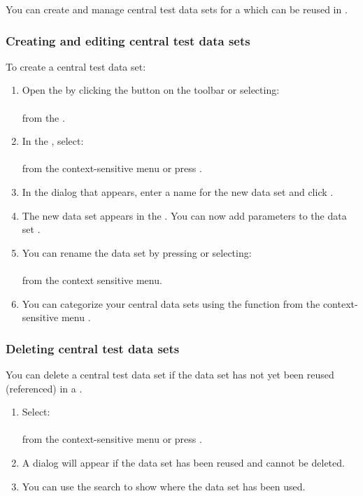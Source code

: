 You can create and manage central test data sets for a \gdproject{} which can be reused in \gdcases{}. 

\subsubsection{Creating and editing central test data sets}
\label{TasksCentralDataCreate}

To create a central test data set:
\begin{enumerate}
\item Open the  \gddataeditor{} by clicking the  button on the toolbar or selecting:\\
\\
from the \gdtestsuitebrowser{}.
\item In the \gddataeditor{}, select:\\
\\
from the context-sensitive menu or press .
\item In the dialog that appears, enter a name for the new data set and click .
\item The new data set appears in the \gddataeditor{}. You can now add parameters to the data set .
\item You can rename the data set by pressing or selecting:\\
\\
from the context sensitive menu.
\item You can categorize your central data sets using the  function from the context-sensitive menu .
\end{enumerate}

\subsubsection{Deleting central test data sets}
You can delete a central test data set if the data set has not yet been reused (referenced) in a \gdcase{} . 
\begin{enumerate}
\item Select:\\
\\
from the context-sensitive menu or press .

\item A dialog will appear if the data set has been reused and cannot be deleted.
\item You can use the search  to show where the data set has been used.
\end{enumerate}

